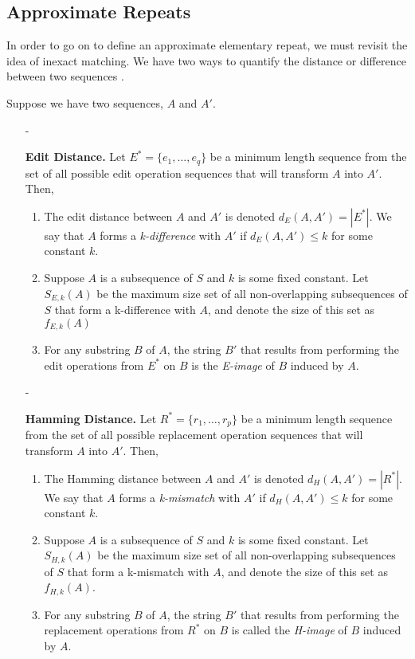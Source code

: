 \subsection{Approximate Repeats}
In order to go on to define an approximate elementary repeat, we must revisit the idea of inexact matching. We have two ways to quantify the distance or difference between two sequences \cite{kurtz2001reputer, zheng2005discovery}.
\begin{notate}
Suppose we have two sequences, $A$ and $A'$.
\begin{itemize}

\item[-]{\textbf{Edit Distance.} Let $E^*=\lbrace e_{1},\dotsc, e_{q} \rbrace$ be a minimum length sequence from the set of all possible edit operation sequences that will transform $A$ into $A'$. Then, 
\begin{enumerate}
\item{The edit distance between $A$ and $A'$ is denoted $d_{E}(A, A') = |E^*|$. We say that $A$ forms a \textit{k-difference} with $A'$ if $d_{E}(A, A') \leq k$ for some constant $k$.} 
\item{Suppose $A$ is a subsequence of $S$ and $k$ is some fixed constant. Let $S_{E,k}(A)$ be the maximum size set of all non-overlapping subsequences of $S$ that form a k-difference with $A$, and denote the size of this set as $f_{E,k}(A)$}
\item{For any substring $B$ of $A$, the string $B'$ that results from performing the edit operations from $E^*$ on $B$ is the \textit{E-image} of $B$ induced by $A$.}
\end{enumerate}}

\item[-]{\textbf{Hamming Distance.} Let $R^*=\lbrace r_{1}, \dotsc, r_{p}\rbrace$ be a minimum length sequence from the set of all possible replacement operation sequences that will transform $A$ into $A'$. Then,
\begin{enumerate}
\item{The Hamming distance between $A$ and $A'$ is denoted $d_{H}(A, A') = |R^*|$. We say that $A$ forms a \textit{k-mismatch} with $A'$ if $d_{H}(A, A') \leq k$ for some constant $k$.}
\item{Suppose $A$ is a subsequence of $S$ and $k$ is some fixed constant. Let $S_{H,k}(A)$ be the maximum size set of all non-overlapping subsequences of $S$ that form a k-mismatch with $A$, and denote the size of this set as $f_{H,k}(A)$.}
\item{For any substring $B$ of $A$, the string $B'$ that results from performing the replacement operations from $R^*$ on $B$ is called the \textit{H-image} of $B$ induced by $A$.}
\end{enumerate}}


\end{itemize}
\end{notate}

